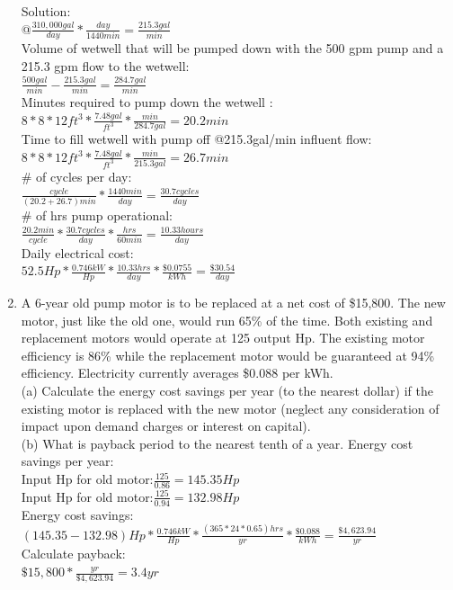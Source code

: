 \documentclass{article}
\begin{document}
\begin{enumerate}
\vspace{0.4cm}
Solution:\\
@$\frac{310,000gal}{day}*\frac{day}{1440min}=\frac{215.3gal}{min}$\\
\vspace{0.4cm}
Volume of wetwell that will be pumped down with the 500 gpm pump and a 215.3 gpm flow to the wetwell:\\
$\frac{500gal}{min}-\frac{215.3gal}{min}=\frac{284.7gal}{min}$\\
\vspace{0.4cm}
Minutes required to pump down the wetwell :\\
$8*8*12ft^3*\frac{7.48gal}{ft^3}*\frac{min}{284.7gal}=\boxed{20.2min}$\\
\vspace{0.4cm}
Time to fill wetwell with pump off @215.3gal/min influent flow:
\\
$8*8*12ft^3*\frac{7.48gal}{ft^3}*\frac{min}{215.3gal}=26.7min$\\
\vspace{0.4cm}
\# of cycles per day:\\
$\frac{cycle}{(20.2+26.7)min}*\frac{1440min}{day}=\frac{30.7cycles}{day}$\\
\vspace{0.4cm}
\# of hrs pump operational:\\
$\frac{20.2min}{cycle}*\frac{30.7 cycles}{day}*\frac{hrs}{60min}=\frac{10.33hours}{day}$\\
\vspace{0.4cm}
Daily electrical cost:\\
$52.5Hp*\frac{0.746kW}{Hp}*\frac{10.33hrs}{day}*\frac{\$0.0755}{kWh}=\boxed{\frac{\$30.54}{day}}$\\
\pagebreak


\item A 6-year old pump motor is to be replaced at a net cost of \$15,800. The new motor, just like the old one, would run 65\% of the time. Both existing and replacement motors would operate at 125 output Hp. The existing motor efficiency is 86\% while the replacement motor would be guaranteed at 94\% efficiency. Electricity currently averages \$0.088 per kWh.\\
(a) Calculate the energy cost savings per year (to the nearest dollar) if the existing motor is replaced with the new motor (neglect any consideration of impact upon demand charges or interest on capital).\\ (b) What is payback period to the nearest tenth of a year.
\vspace{0.4cm}
Energy cost savings per year:\\
Input Hp for old motor:$\frac{125}{0.86}=145.35Hp$\\
Input Hp for old motor:$\frac{125}{0.94}=132.98Hp$\\
Energy cost savings:\\$(145.35-132.98)Hp*\frac{0.746kW}{Hp}*\frac{(365*24*0.65)hrs}{yr}*\frac{\$0.088}{kWh}=\boxed{\frac{\$4,623.94}{yr}}$\\
\vspace{0.4cm}
Calculate payback:\\
$\$15,800*\frac{yr}{\$4,623.94}=\boxed{3.4yr}$


\end{enumerate}
\end{document}
